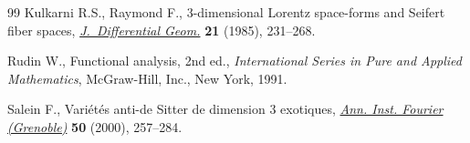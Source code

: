 \begin{thebibliography}{99}
Kulkarni R.S., Raymond F., {$3$}-dimensional {L}orentz space-forms and
 {S}eifert fiber spaces, \href{https://doi.org/10.4310/jdg/1214439564}{\textit{J.~Differential Geom.}} \textbf{21} (1985),
 231--268.

Rudin W., Functional analysis, 2nd ed., \textit{International Series in Pure and
 Applied Mathematics}, McGraw-Hill, Inc., New York, 1991.

Salein F., Vari\'et\'es anti-de {S}itter de dimension 3 exotiques, \href{https://doi.org/10.5802/aif.1754}{\textit{Ann.
 Inst. Fourier (Grenoble)}} \textbf{50} (2000), 257--284.

\end{thebibliography}
